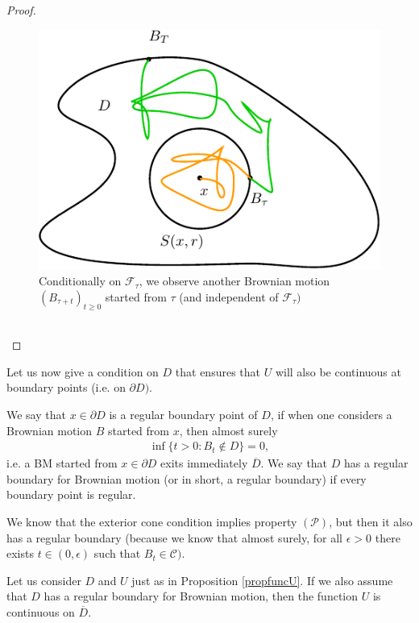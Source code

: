 \documentclass[../mainfile.tex]{subfiles}
\begin{document}
\begin{proof}
\begin{figure}[hbtp]
\centering
\includegraphics[scale=1]{meanvalueprop.pdf}
\caption{Conditionally on $\mathcal{F}_\tau$, we observe another Brownian motion $(B_{\tau+t})_{t \geq 0}$ started from $\tau$ (and independent of $\mathcal{F}_\tau)$} 
\end{figure}
\\
\end{proof}
\newpage
Let us now give a condition on $D$ that ensures that $U$ will also be continuous at boundary points (i.e. on $\partial D)$. 
\begin{defn} We say that $x \in \partial D$ is a regular boundary point of $D$, if when one considers a Brownian motion $B$ started from $x$, then almost surely 
\begin{align*}
\inf \{ t > 0: B_t \notin D \} =0,
\end{align*}
i.e. a BM started from $x \in \partial D$ exits immediately $\overline{D}$. We say that $D$ has a regular boundary for Brownian motion (or in short, a regular boundary) if every boundary point is regular. 
\end{defn}
\begin{rem} We know that the exterior cone condition implies property $(\mathcal{P})$, but then it also has a regular boundary (because we know that almost surely, for all $\epsilon >0$ there exists $t \in (0, \epsilon)$ such that $B_t \in \mathcal{C})$. 
\end{rem}
\begin{prop} \label{propUcontboundary} Let us consider $D$ and $U$ just as in Proposition \ref{propfuncU}. If we also assume that $D$ has a regular boundary for Brownian motion, then the function $U$ is continuous on $\overline{D}$. 
\end{prop}
\end{document}
